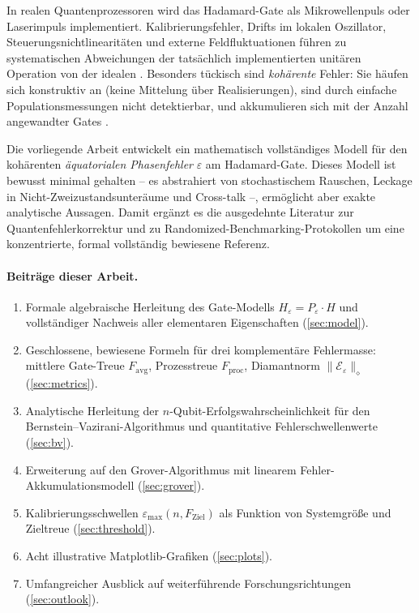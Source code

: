 ﻿\documentclass[11pt,a4paper]{article}
\theoremstyle{definition}
\newcommand{\eps}{\varepsilon}
\newcommand{\Heps}{H_{\!\varepsilon}}
\newcommand{\Pe}{P_{\varepsilon}}
\newcommand{\Fav}{F_{\!\mathrm{avg}}}
\newcommand{\Fdiam}{\|\mathcal{E}_\eps\|_\diamond}
\begin{document}
In realen Quantenprozessoren wird das Hadamard-Gate als Mikrowellenpuls oder
Laserimpuls implementiert.  Kalibrierungsfehler, Drifts im lokalen Oszillator,
Steuerungsnichtlinearitäten und externe Feldfluktuationen führen zu systematischen
Abweichungen der tatsächlich implementierten unitären Operation von der
idealen \cite{Rol2019,Sheldon2016}.  Besonders tückisch sind \emph{kohärente}
Fehler: Sie häufen sich konstruktiv an (keine Mittelung über Realisierungen),
sind durch einfache Populationsmessungen nicht detektierbar, und akkumulieren
sich mit der Anzahl angewandter Gates \cite{Emerson2007}.

Die vorliegende Arbeit entwickelt ein mathematisch vollständiges Modell
für den kohärenten \emph{äquatorialen Phasenfehler} $\eps$ am Hadamard-Gate.
Dieses Modell ist bewusst minimal gehalten -- es abstrahiert von stochastischem
Rauschen, Leckage in Nicht-Zweizustandsunteräume und Cross-talk --,
ermöglicht aber exakte analytische Aussagen.  Damit ergänzt es die ausgedehnte
Literatur zur Quantenfehlerkorrektur \cite{Gottesman1997,Shor1995,Steane1996}
und zu Randomized-Benchmarking-Protokollen \cite{Magesan2011,Knill2008}
um eine konzentrierte, formal vollständig bewiesene Referenz.

\paragraph{Beiträge dieser Arbeit.}
\begin{enumerate}[label=(\roman*)]
  \item Formale algebraische Herleitung des Gate-Modells $\Heps = \Pe \cdot H$
        und vollständiger Nachweis aller elementaren Eigenschaften
        (\cref{sec:model}).
  \item Geschlossene, bewiesene Formeln für drei komplementäre Fehlermasse:
        mittlere Gate-Treue $\Fav$, Prozesstreue $F_{\mathrm{proc}}$,
        Diamantnorm $\Fdiam$ (\cref{sec:metrics}).
  \item Analytische Herleitung der $n$-Qubit-Erfolgswahrscheinlichkeit für
        den Bernstein--Vazirani-Algorithmus und quantitative
        Fehlerschwellenwerte (\cref{sec:bv}).
  \item Erweiterung auf den Grover-Algorithmus mit linearem
        Fehler-Akkumulationsmodell (\cref{sec:grover}).
  \item Kalibrierungsschwellen $\eps_{\max}(n, F_{\mathrm{Ziel}})$
        als Funktion von Systemgröße und Zieltreue (\cref{sec:threshold}).
  \item Acht illustrative Matplotlib-Grafiken (\cref{sec:plots}).
  \item Umfangreicher Ausblick auf weiterführende Forschungsrichtungen
        (\cref{sec:outlook}).
\end{enumerate}
\end{document}
